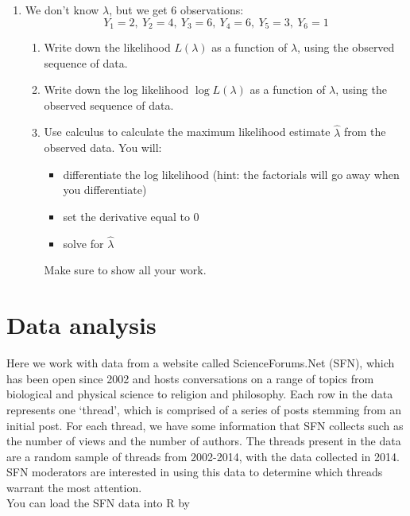 \documentclass[11pt]{article}
\begin{document}
\begin{enumerate}
\item[1.] We don't know $\lambda$, but we get 6 observations:
$$Y_1 = 2, \ Y_2 = 4, \ Y_3 = 6, \ Y_4 = 6, \ Y_5 = 3, \ Y_6 = 1$$

\begin{enumerate}

\item Write down the likelihood $L(\lambda)$ as a function of $\lambda$, using the observed sequence of data.

\item Write down the log likelihood $\log L(\lambda)$ as a function of $\lambda$, using the observed sequence of data.

\item Use calculus to calculate the maximum likelihood estimate $\widehat{\lambda}$ from the observed data. You will:
\begin{itemize}
\item differentiate the log likelihood (hint: the factorials will go away when you differentiate)
\item set the derivative equal to 0
\item solve for $\widehat{\lambda}$
\end{itemize}
Make sure to show all your work.
\end{enumerate}
\end{enumerate}

\vspace{1cm}

\section{Data analysis}

Here we work with data from a website called ScienceForums.Net (SFN), which has been open since 2002 and hosts conversations on a range of topics from biological and physical science to religion and philosophy. Each row in the data represents one ‘thread’, which is comprised of a series of posts stemming from an initial post. For each thread, we have some information that SFN collects such as the number of views and the number of authors. The threads present in the data are a random sample of threads from 2002-2014, with the data collected in 2014. SFN moderators are interested in using this data to determine which threads warrant the most attention.\\

\noindent You can load the SFN data into R by
\end{document}
